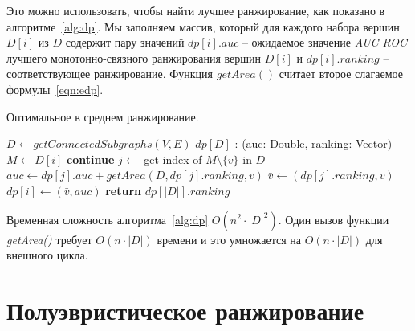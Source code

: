 Это можно использовать, чтобы найти лучшее ранжирование, как показано
в алгоритме~\ref{alg:dp}.  Мы заполняем массив, который для каждого набора
вершин $D[i]$ из $D$ содержит пару значений $dp[i].auc$ -- ожидаемое значение
\emph{AUC ROC} лучшего монотонно-связного ранжирования вершин $D[i]$ и $dp[i].ranking$
-- соответствующее ранжирование. Функция $getArea()$ считает второе слагаемое
формулы~\eqref{eqn:edp}.

\begin{algorithm}
    \caption{Оптимальное в среднем ранжирование.}\label{alg:dp}
    \begin{algorithmic}[1]
        \State $D \gets getConnectedSubgraphs(V, E)$  
        \State $dp[D]$ : (auc: Double, ranking: Vector)
            \State $M \gets D[i]$
                    \State \textbf{continue}
                \EndIf
                \State $j \gets$  get index of $M \setminus \{v\}$ in $D$
                \State $auc \gets dp[j].auc + getArea(D, dp[j].ranking, v)$
                    \State $\bar{v} \gets (dp[j].ranking, v)$
                    \State $dp[i] \gets (\bar{v}, auc)$
                \EndIf
            \EndFor
        \EndFor
        \State \textbf{return} $dp[|D|].ranking$
        \EndProcedure
    \end{algorithmic}
\end{algorithm}

Временная сложность алгоритма~\ref{alg:dp} $O(n^2 \cdot |D|^2)$.  Один вызов
функции \emph{getArea()} требует $O(n \cdot |D|)$ времени и это умножается на
$O(n \cdot |D|)$ для внешного цикла. 





\section{Полуэвристическое ранжирование}
\label{sec_semiheuristic}

